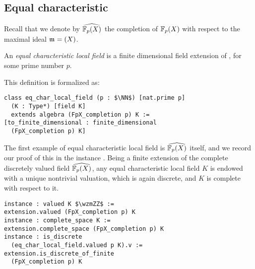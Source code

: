 \documentclass[sigplan,10pt, nonacm, review]{acmart}
\begin{document}
\subsection{Equal characteristic}\label{subsec:eq_char}
Recall that we denote by $\FpXCompl$ the completion of $\mathbb{F}_{p}(X)$ with respect to the maximal ideal $\maxid[\empty]=(X)$.
\begin{definition}\label{def:eq_char_local_field}
An \emph{equal characteristic local field} is a finite dimensional field extension of \FpXCompl, for some prime number $p$.
\end{definition}
This definition is formalized as\href{https://github.com/LCFT-Lean/local_fields/blob/76ad487d09babdb0018f394a5634526637ee014a/src/eq_characteristic/basic.lean#L354}{\extlink}:
\begin{lstlisting}
class eq_char_local_field (p : $\NN$) [nat.prime p]
  (K : Type*) [field K] 
  extends algebra (FpX_completion p) K :=
[to_finite_dimensional : finite_dimensional 
  (FpX_completion p) K]
\end{lstlisting}

The first example of equal characteristic local field is $\FpXCompl$ itself, and we record our proof of this in the instance \href{https://github.com/LCFT-Lean/local_fields/blob/76ad487d09babdb0018f394a5634526637ee014a/src/eq_characteristic/basic.lean#L435}{\extlink}. Being a finite extension of the complete discretely valued field $\FpXCompl$, any equal characteristic  local field $K$ is endowed with a unique nontrivial valuation, which is again discrete, and $K$ is complete with respect to it.
\begin{lstlisting}
instance : valued K $\wzmZZ$ := 
extension.valued (FpX_completion p) K
instance : complete_space K := 
extension.complete_space (FpX_completion p) K
instance : is_discrete 
  (eq_char_local_field.valued p K).v := 
extension.is_discrete_of_finite 
  (FpX_completion p) K
\end{lstlisting}
\end{document}
